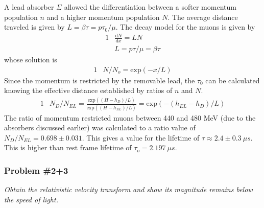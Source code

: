 \documentclass[]{article}
\numberwithin{equation}{subsection}
\begin{document}
A lead absorber $\Sigma$ allowed the differentiation between a softer momentum population $n$ and a higher momentum population $N$. The average distance traveled is given by $L=\beta\tau=p\tau_{0}/\mu$. The decay model for the muons is given by
\begin{alignat}{1}
	\label{aa01}	&\frac{\mathrm{d}N}{\mathrm{d}x}=LN\\
	\label{aa02}	&L=p\tau/\mu=\beta\tau
\end{alignat}
whose solution is
\begin{alignat}{1}
	\label{aa03}	&N/N_{o}=\mathrm{exp}(-x/L)
\end{alignat}
Since the momentum is restricted by the removable lead, the $\tau_{0}$ can be calculated knowing the effective distance established by ratios of $n$ and $N$.
\begin{alignat}{1}
	\label{aa04}	&N_{D}/N_{EL}=\frac{\mathrm{exp}((H-h_{D})/L)}{\mathrm{exp}((H-h_{EL})/L)}=\mathrm{exp}(-(h_{EL}-h_{D})/L)
\end{alignat}
The ratio of momentum restricted muons between 440 and 480 MeV (due to the absorbers discussed earlier) was calculated to a ratio value of $N_{D}/N_{EL}=0.698\pm0.031$. This gives a value for the lifetime of $\tau\approx2.4\pm0.3\ \mu s$. This is higher than rest frame lifetime of $\tau_{o}=2.197\ \mu s$.
\subsubsection*{Problem \#2+3}
\emph{Obtain the relativistic velocity transform and show its magnitude remains below the speed of light.}\\
\end{document}
